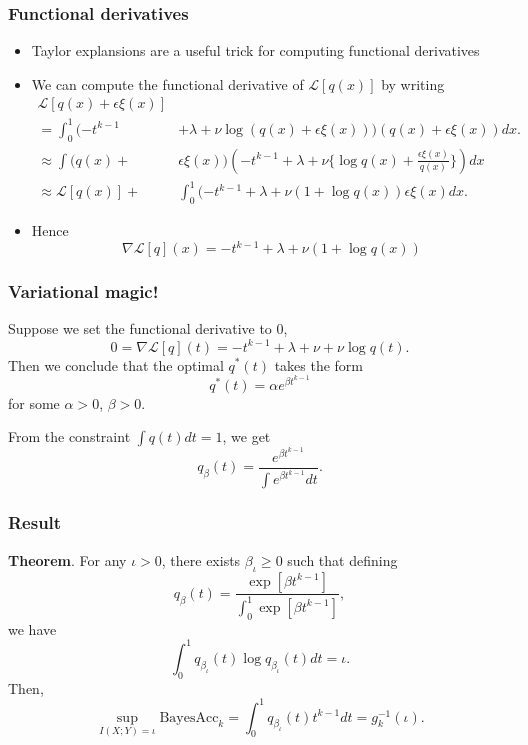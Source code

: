 \documentclass{beamer}
\begin{document}
\begin{frame}
\frametitle{Functional derivatives}
\begin{itemize}
\item Taylor explansions are a useful trick for computing functional derivatives
\item We can compute the functional derivative of $\mathcal{L}[q(x)]$ by writing
\begin{align*}
\mathcal{L}[q(x) + \epsilon \xi(x)] &
\\= \int_0^1 (-t^{k-1} &+ \lambda + \nu \log (q(x) + \epsilon \xi(x))) (q(x) + \epsilon \xi(x)) dx.
\\\approx  \int (q(x) + &\epsilon \xi(x)) (-t^{k-1} + \lambda + \nu \{\log q(x) + \frac{\epsilon \xi(x)}{q(x)}\}) dx
\\\approx  \mathcal{L}[q(x)] +& \int_0^1 (-t^{k-1} + \lambda + \nu (1 + \log q(x)) \epsilon\xi(x) dx.
\end{align*}
\item Hence
\[
\nabla \mathcal{L}[q](x) = -t^{k-1} + \lambda + \nu (1 + \log q(x))
\]
\end{itemize}
\end{frame}

\begin{frame}
\frametitle{Variational magic!}
Suppose we set the functional derivative to 0,
\[
0 = \nabla \mathcal{L}[q](t) = -t^{k-1} + \lambda + \nu + \nu \log q(t).
\]
Then we conclude that the optimal $q^*(t)$ takes the form
\[
q^*(t) = \alpha e^{\beta t^{k-1}}
\]
for some $\alpha > 0$, $\beta > 0$.

From the constraint $\int q(t)dt = 1$, we get
\[
q_\beta(t) = \frac{e^{\beta t^{k-1}}}{\int e^{\beta t^{k-1}} dt}.
\]
\end{frame}

\begin{frame}
\frametitle{Result}
\textbf{Theorem}.
For any $\iota > 0$, there exists $\beta_\iota \geq 0$ such that defining
\[
q_\beta(t) = \frac{\exp[\beta t^{k-1}]}{\int_0^1 \exp[\beta t^{k-1}]},
\]
we have
\[
\int_0^1 q_{\beta_\iota}(t) \log q_{\beta_\iota}(t) dt = \iota.
\]
Then,
\[
\sup_{I(X; Y) = \iota} \text{BayesAcc}_k = \int_0^1 q_{\beta_\iota}(t) t^{k-1} dt = g_k^{-1}(\iota).
\]
\end{frame}
\end{document}
